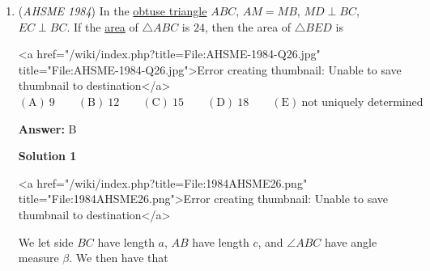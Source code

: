 \begin{enumerate}
 $\mathrm{(A) \ }\sqrt{11} \qquad \mathrm{(B) \ }\sqrt{12} \qquad \mathrm{(C) \ } \sqrt{13}\qquad \mathrm{(D) \ }\sqrt{14} \qquad \mathrm{(E) \ } \text{not uniquely determined}$

 \textbf{Answer: }D



\textbf{Solution}

Let the edge lengths be $a, b$, and $c$. Therefore, the total area of all its faces is $2ab+2bc+2ac$. Therefore, $2ab+2bc+2ac=22$ and $ab+bc+ac=11$. Also, the total lengths of all of its edges is $4a+4b+4c$, so $4a+4b+4c=24$, and $a+b+c=6$. Therefore, we have:

 $ab+bc+ac=11$

 and

 $a+b+c=6$.

 The length of the interior diagonal is $\sqrt{a^2+b^2+c^2}$, so if we can find $a^2+b^2+c^2$, we can find the diagonal. We square the second equation above to introduce an $a^2+b^2+c^2$:

 $(a+b+c)^2=a^2+b^2+c^2+2ab+2bc+2ac=36$.

 However, we already know that $2ab+2bc+2ac=22$, so $a^2+b^2+c^2+22=36\implies a^2+b^2+c^2=14\implies \sqrt{a^2+b^2+c^2}=\sqrt{14}, \boxed{\text{D}}$.

 


	\item (\textit{AHSME 1984}) In the \href{https://artofproblemsolving.com/wiki/index.php?title=Obtuse\_triangle}{obtuse triangle} $ABC$, $AM=MB$, $MD\perp BC$, $EC\perp BC$. If the \href{https://artofproblemsolving.com/wiki/index.php?title=Area}{area} of $\triangle ABC$ is $24$, then the area of $\triangle BED$ is


 <a href="/wiki/index.php?title=File:AHSME-1984-Q26.jpg" title="File:AHSME-1984-Q26.jpg">Error creating thumbnail: Unable to save thumbnail to destination</a>
$\mathrm{(A) \ }9 \qquad \mathrm{(B) \ }12 \qquad \mathrm{(C) \ } 15 \qquad \mathrm{(D) \ }18 \qquad \mathrm{(E) \ } \text{not uniquely determined}$

 \textbf{Answer: }B



\textbf{Solution 1}

<a href="/wiki/index.php?title=File:1984AHSME26.png" title="File:1984AHSME26.png">Error creating thumbnail: Unable to save thumbnail to destination</a>

 We let side $BC$ have length $a$, $AB$ have length $c$, and $\angle ABC$ have angle measure $\beta$. We then have that


\end{enumerate}
